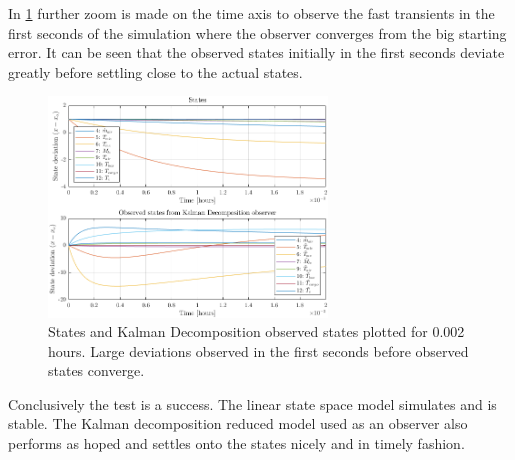 \newpage
\noindent In \cref{fig:sim_stateObsState002h} further zoom is made on the time axis to observe the fast transients in the first seconds of the simulation where the observer converges from the big starting error. It can be seen that the observed states initially in the first seconds deviate greatly before settling close to the actual states.

\begin{figure}[h!]
	\centering
	\includegraphics[width=0.66\textwidth]{Graphics/fig_stateObsState002h.png}
	\caption{States and Kalman Decomposition observed states plotted for 0.002 hours. Large deviations observed in the first seconds before observed states converge.}
	\label{fig:sim_stateObsState002h}
\end{figure}

Conclusively the test is a success. The linear state space model simulates and is stable. The Kalman decomposition reduced model used as an observer also performs as hoped and settles onto the states nicely and in timely fashion.

